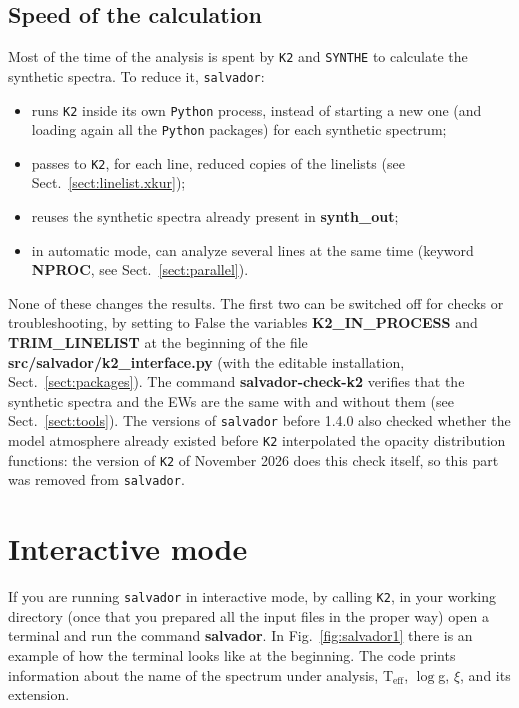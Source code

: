 \documentclass[modern]{aastex701}
\begin{document}
\subsection{Speed of the calculation} \label{sect:speed}
Most of the time of the analysis is spent by \texttt{K2} and \texttt{SYNTHE} to calculate the synthetic spectra. To reduce it, \texttt{salvador}:
\begin{itemize}
    \item runs \texttt{K2} inside its own \texttt{Python} process, instead of starting a new one (and loading again all the \texttt{Python} packages) for each synthetic spectrum;
    \item passes to \texttt{K2}, for each line, reduced copies of the linelists (see Sect.~\ref{sect:linelist.xkur});
    \item reuses the synthetic spectra already present in {\bf synth\_out};
    \item in automatic mode, can analyze several lines at the same time (keyword {\bf NPROC}, see Sect.~\ref{sect:parallel}).
\end{itemize}
None of these changes the results. The first two can be switched off for checks or troubleshooting, by setting to False the variables {\bf K2\_IN\_PROCESS} and {\bf TRIM\_LINELIST} at the beginning of the file {\bf src/salvador/k2\_interface.py} (with the editable installation, Sect.~\ref{sect:packages}). The command {\bf salvador-check-k2} verifies that the synthetic spectra and the EWs are the same with and without them (see Sect.~\ref{sect:tools}). The versions of \texttt{salvador} before 1.4.0 also checked whether the model atmosphere already existed before \texttt{K2} interpolated the opacity distribution functions: the version of \texttt{K2} of November 2026 does this check itself, so this part was removed from \texttt{salvador}.

\section{Interactive mode} \label{sect:interactive}
If you are running \texttt{salvador} in interactive mode, by calling \texttt{K2}, in your working directory (once that you prepared all the input files in the proper way) open a terminal and run the command {\bf salvador}. In Fig.~\ref{fig:salvador1} there is an example of how the terminal looks like at the beginning. The code prints information about the name of the spectrum under analysis, T$_{\mathrm{eff}}$, $\log$g, $\xi$, and its extension. 
\end{document}
